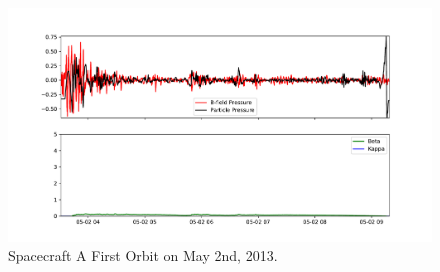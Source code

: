 \documentclass{report}
\begin{document}
\begin{figure}
\includegraphics[scale=.45]{A_Orbit4.pdf}
\caption{Spacecraft A First Orbit on May 2nd, 2013.}
\end{figure}
\end{document}
